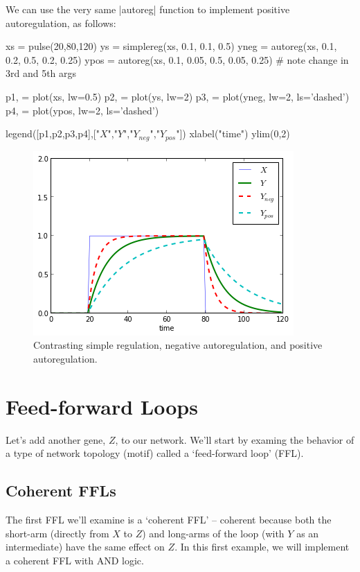 We can use the very same |autoreg| function to implement positive autoregulation, as follows:
%
\begin{python}
xs = pulse(20,80,120)
ys = simplereg(xs, 0.1, 0.1, 0.5)
yneg = autoreg(xs, 0.1, 0.2, 0.5, 0.2, 0.25)
ypos = autoreg(xs, 0.1, 0.05, 0.5, 0.05, 0.25) # note change in 3rd and 5th args

p1, = plot(xs, lw=0.5)
p2, = plot(ys, lw=2)
p3, = plot(yneg, lw=2, ls='dashed')
p4, = plot(ypos, lw=2, ls='dashed')

legend([p1,p2,p3,p4],["$X$","$Y$","$Y_{neg}$","$Y_{pos}$"])
xlabel("time")
ylim(0,2)
\end{python}
%
\begin{figure}[!ht]
    \centering
    \includegraphics[width=0.33\columnwidth]{./figures/hands-on12/fig-autoreg.png}
    \caption{Contrasting simple regulation, negative autoregulation, and positive autoregulation.}\label{fig:autoreg}
\end{figure}


\section{Feed-forward Loops}

Let's add another gene, $Z$, to our network. We'll start by examing the behavior of a type of network topology (motif) called a `feed-forward loop' (FFL).


\subsection{Coherent FFLs}
The first FFL we'll examine is a `coherent FFL' -- coherent because both the short-arm (directly from $X$ to $Z$) and long-arms of the loop (with $Y$ as an intermediate) have the same effect on $Z$. In this first example, we will implement a coherent FFL with AND logic.

